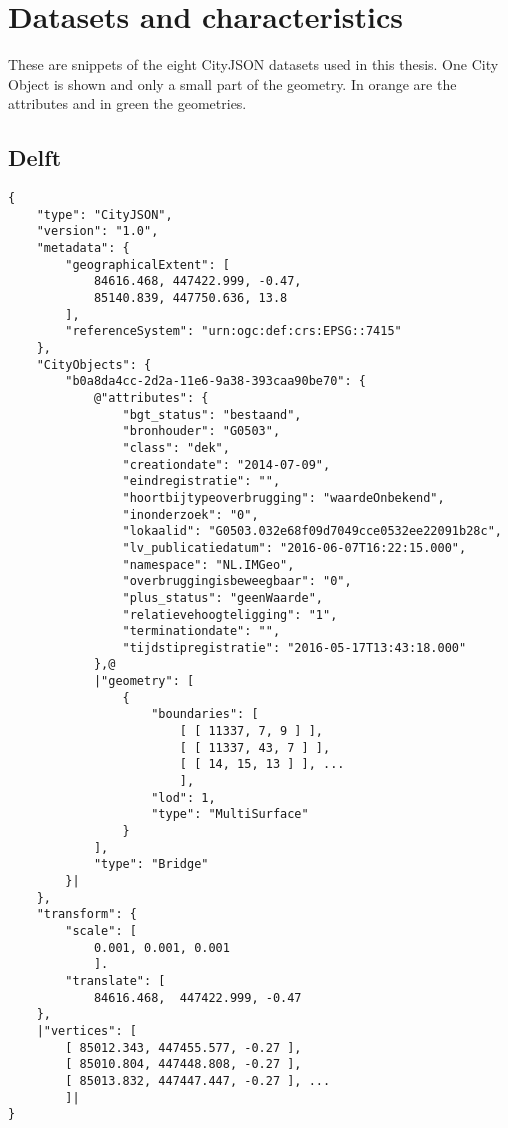 

\chapter{Datasets and characteristics}
\label{ch:datasets}
These are snippets of the eight CityJSON datasets used in this thesis.
One City Object is shown and only a small part of the geometry.
In orange are the attributes and in green the geometries.

\clearpage

\section{Delft}

\begin{scriptsize}
\begin{minipage}[c]{\linewidth / 1}


\begin{lstlisting}[frame=single,style=base,caption={Snippet of Delft dataset}, label=dataset:delft]
{
    "type": "CityJSON",
    "version": "1.0",
    "metadata": {
        "geographicalExtent": [
            84616.468, 447422.999, -0.47,
            85140.839, 447750.636, 13.8
        ],
        "referenceSystem": "urn:ogc:def:crs:EPSG::7415"
    },
    "CityObjects": {
        "b0a8da4cc-2d2a-11e6-9a38-393caa90be70": {
            @"attributes": {
                "bgt_status": "bestaand",
                "bronhouder": "G0503",
                "class": "dek",
                "creationdate": "2014-07-09",
                "eindregistratie": "",
                "hoortbijtypeoverbrugging": "waardeOnbekend",
                "inonderzoek": "0",
                "lokaalid": "G0503.032e68f09d7049cce0532ee22091b28c",
                "lv_publicatiedatum": "2016-06-07T16:22:15.000",
                "namespace": "NL.IMGeo",
                "overbruggingisbeweegbaar": "0",
                "plus_status": "geenWaarde",
                "relatievehoogteligging": "1",
                "terminationdate": "",
                "tijdstipregistratie": "2016-05-17T13:43:18.000"
            },@
            |"geometry": [
                {
                    "boundaries": [ 
                        [ [ 11337, 7, 9 ] ],
                        [ [ 11337, 43, 7 ] ],
                        [ [ 14, 15, 13 ] ], ... 
                        ],
                    "lod": 1,
                    "type": "MultiSurface"
                }
            ],
            "type": "Bridge"
        }|
    },
    "transform": {	
        "scale": [	
            0.001, 0.001, 0.001	
            ].	
        "translate": [	
            84616.468,	447422.999,	-0.47		
    },
    |"vertices": [
        [ 85012.343, 447455.577, -0.27 ],
        [ 85010.804, 447448.808, -0.27 ],
        [ 85013.832, 447447.447, -0.27 ], ... 
        ]|
}
\end{lstlisting}



\end{minipage}
\end{scriptsize}
